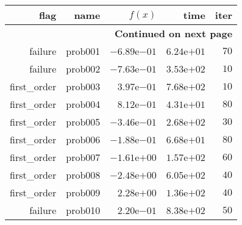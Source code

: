 \begin{longtable}{rrrrr}
\hline
flag & name & \(f(x)\) & time & iter \\\hline
\endhead
\hline
\multicolumn{5}{r}{{\bfseries Continued on next page}}\\
\hline
\endfoot
\endlastfoot
failure & prob001 & \(-6.89\)e\(-01\) & \( 6.24\)e\(+01\) & \(    70\) \\
failure & prob002 & \(-7.63\)e\(-01\) & \( 3.53\)e\(+02\) & \(    10\) \\
first\_order & prob003 & \( 3.97\)e\(-01\) & \( 7.68\)e\(+02\) & \(    10\) \\
first\_order & prob004 & \( 8.12\)e\(-01\) & \( 4.31\)e\(+01\) & \(    80\) \\
first\_order & prob005 & \(-3.46\)e\(-01\) & \( 2.68\)e\(+02\) & \(    30\) \\
first\_order & prob006 & \(-1.88\)e\(-01\) & \( 6.68\)e\(+01\) & \(    80\) \\
first\_order & prob007 & \(-1.61\)e\(+00\) & \( 1.57\)e\(+02\) & \(    60\) \\
first\_order & prob008 & \(-2.48\)e\(+00\) & \( 6.05\)e\(+02\) & \(    40\) \\
first\_order & prob009 & \( 2.28\)e\(+00\) & \( 1.36\)e\(+02\) & \(    40\) \\
failure & prob010 & \( 2.20\)e\(-01\) & \( 8.38\)e\(+02\) & \(    50\) \\\hline
\end{longtable}
